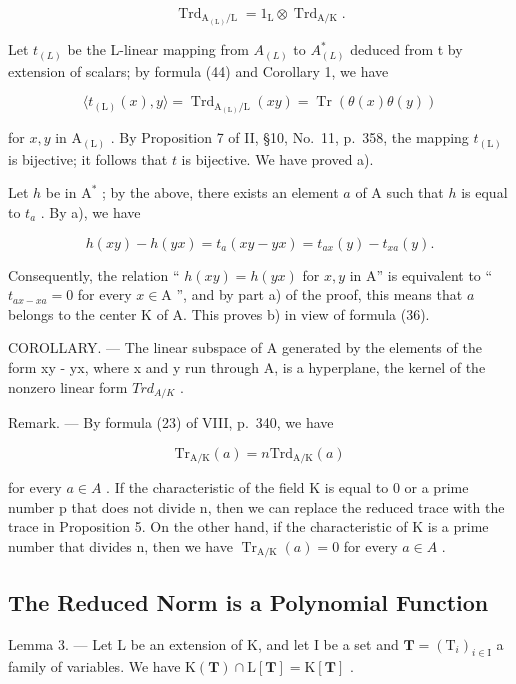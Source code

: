 \[
\operatorname{Trd} _ {\mathrm{A} _ {(\mathrm{L})} / \mathrm{L}} = 1 _ {\mathrm{L}} \otimes \operatorname{Trd} _ {\mathrm{A} / \mathrm{K}}.\tag{44}
\]

Let \(t_{(L)}\) be the L-linear mapping from \(A_{(L)}\) to \(A_{(L)}^{*}\) deduced from t by extension of scalars; by formula (44) and Corollary 1, we have

\[
\langle t _ {(\mathrm{L})} (x), y \rangle = \operatorname{Trd} _ {\mathrm{A} _ {(\mathrm{L})} / \mathrm{L}} (x y) = \operatorname{Tr} (\theta (x) \theta (y))\tag{45}
\]

for \(x, y\) in \(\mathrm{A}_{(\mathrm{L})}\) . By Proposition 7 of II, §10, No.~11, p.~358, the mapping \(t_{(\mathrm{L})}\) is bijective; it follows that \(t\) is bijective. We have proved a).

Let \(h\) be in \(\mathrm{A}^*\) ; by the above, there exists an element \(a\) of \(\mathrm{A}\) such that \(h\) is equal to \(t_a\) . By a), we have

\[
h (x y) - h (y x) = t _ {a} (x y - y x) = t _ {a x} (y) - t _ {x a} (y).
\]

Consequently, the relation `` \(h(xy) = h(yx)\) for \(x,y\) in A'' is equivalent to `` \(t_{ax-xa} = 0\) for every \(x \in \mathrm{A}\) '', and by part a) of the proof, this means that \(a\) belongs to the center K of A. This proves b) in view of formula (36).

COROLLARY. --- The linear subspace of A generated by the elements of the form xy - yx, where x and y run through A, is a hyperplane, the kernel of the nonzero linear form \(Trd_{A/K}\) .

Remark. --- By formula (23) of VIII, p.~340, we have

\[
\mathrm{Tr} _ {\mathrm{A/K}} (a) = n \mathrm{Trd} _ {\mathrm{A/K}} (a)
\]

for every \(a \in A\) . If the characteristic of the field K is equal to 0 or a prime number p that does not divide n, then we can replace the reduced trace with the trace in Proposition 5. On the other hand, if the characteristic of K is a prime number that divides n, then we have \(\operatorname{Tr}_{\mathrm{A}/\mathrm{K}}(a) = 0\) for every \(a \in A\) .

\subsection{The Reduced Norm is a Polynomial Function}

Lemma 3. --- Let L be an extension of K, and let I be a set and \(\mathbf{T} = (\mathrm{T}_i)_{i\in \mathrm{I}}\) a family of variables. We have \(\mathrm{K}(\mathbf{T})\cap \mathrm{L}[\mathbf{T}] = \mathrm{K}[\mathbf{T}]\) .

